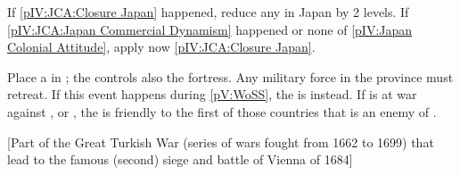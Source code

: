 

\phevnt{}
\aparag If \ref{pIV:JCA:Closure Japan} happened, reduce any \TP in Japan by 2
levels.
\aparag If \ref{pIV:JCA:Japan Commercial Dynamism} happened or none of
\ref{pIV:Japan Colonial Attitude}, apply now \ref{pIV:JCA:Closure Japan}.










\phevnt
\aparag Place a \REVOLT \facemoins in \provinceCatalunya ; the \REVOLT
controls also the fortress. Any military force in the province must retreat.
\bparag If this event happens during \ref{pV:WoSS}, the \REVOLT is \faceplus
instead.
\aparag If \SPA is at war against \FRA, \ENG or \AUT, the \REVOLT is friendly
to the first of those countries that is an enemy of \SPA.





[Part of the Great Turkish War (series of wars fought from
1662 to 1699) that lead to the famous (second) siege and battle of Vienna of
1684]

\stopevents


